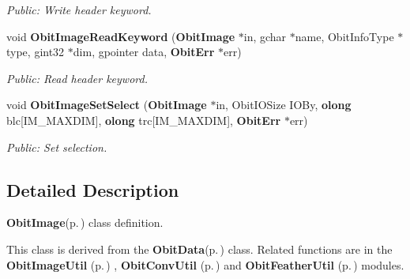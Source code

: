 \begin{CompactItemize}
\begin{CompactList}\small\item\em Public: Write header keyword. \item\end{CompactList}\item 
void {\bf Obit\-Image\-Read\-Keyword} ({\bf Obit\-Image} $\ast$in, gchar $\ast$name, Obit\-Info\-Type $\ast$type, gint32 $\ast$dim, gpointer data, {\bf Obit\-Err} $\ast$err)
\begin{CompactList}\small\item\em Public: Read header keyword. \item\end{CompactList}\item 
void {\bf Obit\-Image\-Set\-Select} ({\bf Obit\-Image} $\ast$in, Obit\-IOSize IOBy, {\bf olong} blc[IM\_\-MAXDIM], {\bf olong} trc[IM\_\-MAXDIM], {\bf Obit\-Err} $\ast$err)
\begin{CompactList}\small\item\em Public: Set selection. \item\end{CompactList}\end{CompactItemize}


\subsection{Detailed Description}
{\bf Obit\-Image}{\rm (p.\,\pageref{structObitImage})} class definition. 

This class is derived from the {\bf Obit\-Data}{\rm (p.\,\pageref{structObitData})} class. Related functions are in the {\bf Obit\-Image\-Util }{\rm (p.\,\pageref{ObitImageUtil_8h})} , {\bf Obit\-Conv\-Util }{\rm (p.\,\pageref{ObitConvUtil_8h})} and {\bf Obit\-Feather\-Util }{\rm (p.\,\pageref{ObitFeatherUtil_8h})} modules.

